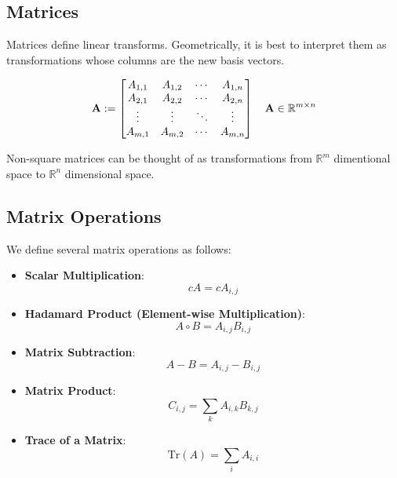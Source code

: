 \subsection{Matrices}

Matrices define linear transforms. Geometrically, it is best to interpret them as transformations whose columns are the new basis vectors.

\begin{equation}
    \mathbf{A} := \begin{bmatrix} A_{1,1} & A_{1,2} & \cdots & A_{1,n} \\ A_{2,1} & A_{2,2} & \cdots & A_{2,n} \\ \vdots & \vdots & \ddots & \vdots \\ A_{m,1} & A_{m,2} & \cdots & A_{m,n} \end{bmatrix} \quad \mathbf{A} \in \mathbb{R}^{m \times n}
\end{equation}


Non-square matrices can be thought of as transformations from $\mathbb{R}^m$ dimentional space to $\mathbb{R}^n$ dimensional space.

\subsection{Matrix Operations}

We define several matrix operations as follows:

\begin{itemize}
    \item \textbf{Scalar Multiplication}:
          \begin{equation}
              cA = c A_{i,j}
          \end{equation}

    \item \textbf{Hadamard Product (Element-wise Multiplication)}:
          \begin{equation}
              A \circ B = A_{i,j} B_{i,j}
          \end{equation}

    \item \textbf{Matrix Subtraction}:
          \begin{equation}
              A - B = A_{i,j} - B_{i,j}
          \end{equation}

    \item \textbf{Matrix Product}:
          \begin{equation}
              C_{i,j} = \sum_{k} A_{i,k} B_{k,j}
          \end{equation}

    \item \textbf{Trace of a Matrix}:
          \begin{equation}
              \text{Tr}(A) = \sum_{i} A_{i,i}
          \end{equation}
\end{itemize}

